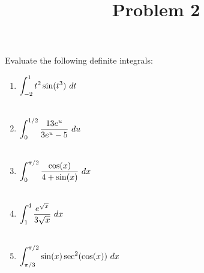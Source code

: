 \documentclass{ximera}
\title[Problem 2]{Problem 2}
\begin{document}
\begin{abstract} \end{abstract}
\maketitle

\begin{problem}
	Evaluate the following definite integrals:
	\begin{enumerate}
		\item $\displaystyle \int_{-2}^1 t^2 \sin(t^3) \, \,d t$\\ \\
\item $\displaystyle \int_{0}^{1/2} \dfrac{13e^u}{3e^u-5} \, \,d u$\\ \\
\item $\displaystyle \int_{0}^{\pi/2} \dfrac{\cos(x)}{4+\sin(x)} \, \,d x$\\ \\
\item $\displaystyle \int_{1}^{4} \dfrac{e^{\sqrt{x}}}{3\sqrt{x}} \, \,d x$\\ \\
\item $\displaystyle \int_{\pi/3}^{\pi/2} \sin(x)\sec^2(\cos(x)) \, \,d x$\\ \\
\end{enumerate}
\end{problem}
\end{document}
